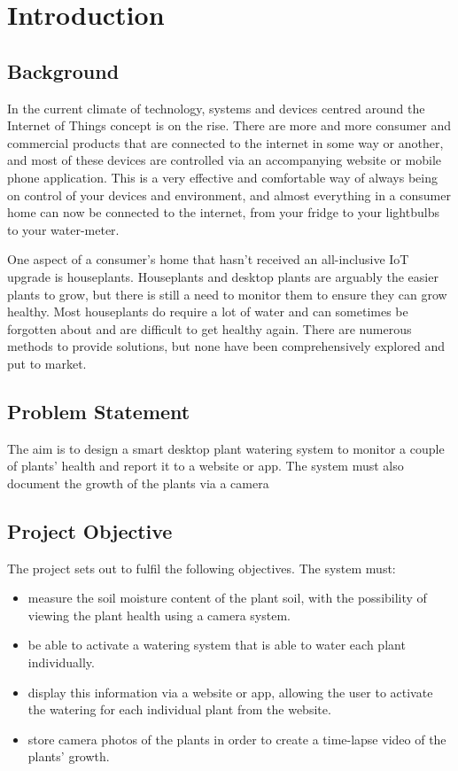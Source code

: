 \graphicspath{{introduction/fig/}}


\chapter{Introduction} 
\label{chap:introduction}
\section{Background}

In the current climate of technology, systems and devices centred around the Internet of Things concept is on the rise.
There are more and more consumer and commercial products that are connected to the internet in some way or another, and most of these devices are controlled via an accompanying website or mobile phone application.
This is a very effective and comfortable way of always being on control of your devices and environment, and almost everything in a consumer home can now be connected to the internet, from your fridge to your lightbulbs to your water-meter.

One aspect of a consumer's home that hasn't received an all-inclusive IoT upgrade is houseplants.
Houseplants and desktop plants are arguably the easier plants to grow, but there is still a need to monitor them to ensure they can grow healthy. 
Most houseplants do require a lot of water and can sometimes be forgotten about and are difficult to get healthy again.
There are numerous methods to provide solutions, but none have been comprehensively explored and put to market.

\section{Problem Statement}

The aim is to design a smart desktop plant watering system to monitor a couple of plants' health and report it to a website or app. 
The system must also document the growth of the plants via a camera 

\section{Project Objective}
  
The project sets out to fulfil the following objectives. The system must:

\begin{itemize}
    \item measure the soil moisture content of the plant soil, with the possibility of viewing the plant health using a camera system. 
    \item be able to activate a watering system that is able to water each plant individually.
    \item display this information via a website or app, allowing the user to activate the watering for each individual plant from the website.
    \item store camera photos of the plants in order to create a time-lapse video of the plants' growth.   
\end{itemize}

